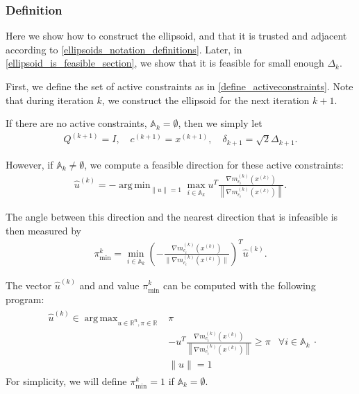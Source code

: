 \documentclass{article}
\theoremstyle{case}
\numberwithin{theorem}{subsection}
\DeclareMathOperator*{\argmin}{arg\,min}
\DeclareMathOperator*{\argmax}{arg\,max}
\newcommand{\activeconstraintsk}{{\mathbb A_{k}}}
\newcommand{\dk}{\Delta_k}
\newcommand{\dkpo}{\Delta_{k+1}}
\newcommand{\gmcik}{{\nabla m_{c_i}^{(k)}\left(\xk\right)}}
\newcommand{\hgik}{{\frac{\nabla m^{(k)}_{c_i}(\xk)}{\|\nabla m^{(k)}_{c_i}\left(\xk\right)\|}}}
\newcommand{\huk}{{{\hat u}^{(k)}}}
\newcommand{\reals}{\mathbb R}
\newcommand{\Rn}{\mathbb R^n}
\newcommand{\thetamink}{{\pi^k_{\textrm{min}}}}
\newcommand{\xkpo}{{{x}^{(k+1)}}}
\newcommand{\xk}{x^{(k)}}
\newcommand{\zik}{{z^{(i, k)}}}
\newcommand{\qkpo}{{Q^{(k+1)}}}
\newcommand{\ckpo}{{c^{(k+1)}}}
\newcommand{\sdkpo}{{\delta_{k+1}}}
\begin{document}
\subsubsection{Definition}

Here we show how to construct the ellipsoid, and that it is 
trusted and adjacent
according to \cref{ellipsoids_notation_definitions}.
Later, in \cref{ellipsoid_is_feasible_section}, we show that it is feasible for small enough $\dk$.

First, we define the set of active constraints as in \cref{define_activeconstraints}.
Note that during iteration $k$, we construct the ellipsoid for the next iteration $k+1$.

If there are no active constraints, $\activeconstraintsk = \emptyset$, then we simply let
\begin{align}
\qkpo = I, \quad \ckpo = \xkpo, \quad \sdkpo = \sqrt{2} \dkpo. \label{define_trivial_ellipsek}
\end{align}

However, if $\activeconstraintsk \ne \emptyset$, we compute a feasible direction for these active constraints:
\begin{align}
\huk = -\argmin_{\|u\| = 1} \max_{i \in \activeconstraintsk} u^T \frac{\gmcik}{\left\|\gmcik\right\|}. \label{define_u}
\end{align}


The angle between this direction and the nearest direction that is infeasible is then measured by
\begin{align}
\thetamink = \min_{i \in \activeconstraintsk} \left(-\hgik\right)^T \huk \label{define_thetamink}.
\end{align}

The vector $\huk$ and and value $\thetamink$ can be computed with the following program:
\begin{align*}
\begin{array}{ccc}
\huk \in \argmax_{u\in\Rn, \pi \in\reals} & \pi \\
& -u^T \frac{\gmcik}{\left\|\gmcik\right\|} \ge \pi & \forall i \in \activeconstraintsk \\
& \|u \| = 1& 
\end{array}.
\end{align*}
For simplicity, we will define $\thetamink = 1$ if $\activeconstraintsk = \emptyset$.
\end{document}
